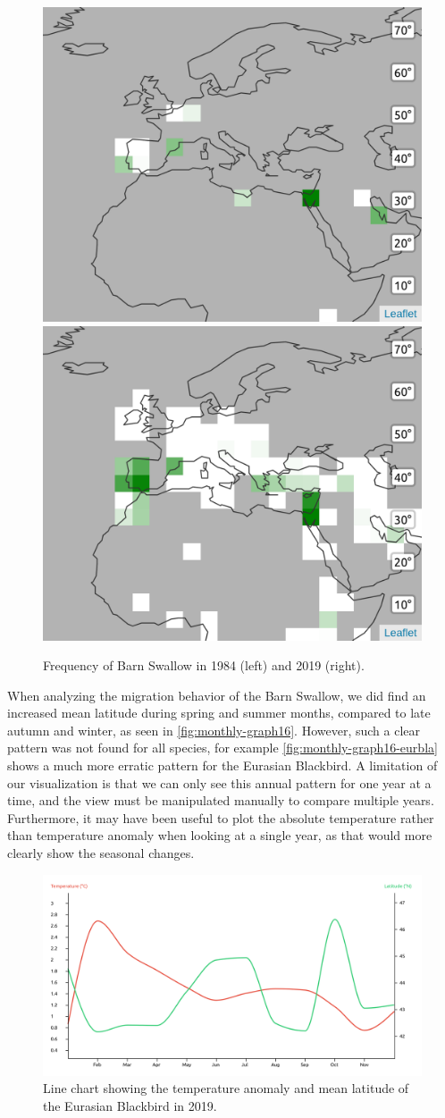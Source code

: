 \documentclass[journal]{vgtc}                %
\begin{document}
\begin{figure}[t]
  \centering
    \includegraphics[width=0.48\linewidth]{bird-map-barswa-1984-03.png}
    \hfill
    \includegraphics[width=0.48\linewidth]{bird-map-barswa-2019-03.png}
    \caption{Frequency of Barn Swallow in 1984 (left) and 2019 (right).}
    \label{fig:birds-comparison}
\end{figure}

When analyzing the migration behavior of the Barn Swallow, we did find an increased mean latitude during spring and summer months, compared to late autumn and winter, as seen in \autoref{fig:monthly-graph16}. However, such a clear pattern was not found for all species, for example \autoref{fig:monthly-graph16-eurbla} shows a much more erratic pattern for the Eurasian Blackbird. A limitation of our visualization is that we can only see this annual pattern for one year at a time, and the view must be manipulated manually to compare multiple years. Furthermore, it may have been useful to plot the absolute temperature rather than temperature anomaly when looking at a single year, as that would more clearly show the seasonal changes.

\begin{figure}[t]
  \centering
  \includegraphics[width=\linewidth]{monthly-graph16-eurbla.png}
  \caption{Line chart showing  the temperature anomaly and mean latitude of the Eurasian Blackbird in 2019.}
  \label{fig:monthly-graph16-eurbla}
\end{figure}
\end{document}
